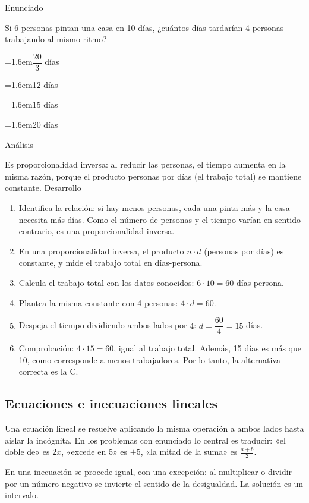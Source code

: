 \documentclass[10pt,a4paper,twocolumn]{article}
\newcommand{\alternativa}[2]{\par\noindent\hangindent=1.6em\hangafter=1\makebox[1.6em][l]{\tecla{#1}}#2\par}
\newcommand{\clave}[1]{\par\smallskip{\sffamily\footnotesize\color{esmeralda} Clave \teclaok{#1}}\par}
\begin{document}
\begin{ejemplo}
{\sffamily\footnotesize\color{zinc500} Enunciado}\par
Si 6 personas pintan una casa en 10 días, ¿cuántos días tardarían 4 personas trabajando al mismo ritmo?
\alternativa{A}{$\dfrac{20}{3}$ días}
\alternativa{B}{12 días}
\alternativa{C}{15 días}
\alternativa{D}{20 días}
\clave{C}
{\sffamily\footnotesize\color{zinc500} Análisis}\par Es proporcionalidad inversa: al reducir las personas, el tiempo aumenta en la misma razón, porque el producto personas por días (el trabajo total) se mantiene constante.
{\sffamily\footnotesize\color{zinc500} Desarrollo}
\begin{enumerate}
  \item Identifica la relación: si hay menos personas, cada una pinta más y la casa necesita más días. Como el número de personas y el tiempo varían en sentido contrario, es una proporcionalidad inversa.
  \item En una proporcionalidad inversa, el producto $n\cdot d$ (personas por días) es constante, y mide el trabajo total en días-persona.
  \item Calcula el trabajo total con los datos conocidos: $6\cdot 10 = 60$ días-persona.
  \item Plantea la misma constante con 4 personas: $4\cdot d = 60$.
  \item Despeja el tiempo dividiendo ambos lados por $4$: $d = \dfrac{60}{4} = 15$ días.
  \item Comprobación: $4\cdot 15 = 60$, igual al trabajo total. Además, 15 días es más que 10, como corresponde a menos trabajadores. Por lo tanto, la alternativa correcta es la C.
\end{enumerate}
\end{ejemplo}

\subsection{Ecuaciones e inecuaciones lineales}

Una ecuación lineal se resuelve aplicando la misma operación a ambos lados hasta aislar la incógnita. En los problemas con enunciado lo central es traducir: «el doble de» es $2x$, «excede en 5» es $+5$, «la mitad de la suma» es $\frac{a+b}{2}$.

En una inecuación se procede igual, con una excepción: al multiplicar o dividir por un número negativo se invierte el sentido de la desigualdad. La solución es un intervalo.
\end{document}
